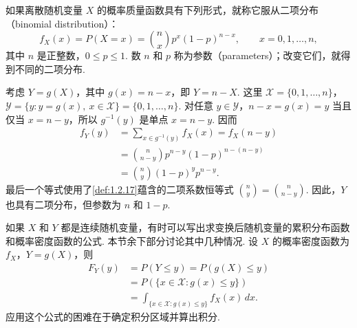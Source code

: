 \begin{example}[二项变换]\label{ex:2.1.1}
如果离散随机变量 $X$ 的概率质量函数具有下列形式，就称它服从二项分布（binomial distribution）：
\begin{equation}\label{eq:2.1.3}
f_X(x)=P(X=x)=\binom nx p^x(1-p)^{n-x},\qquad x=0,1,\ldots,n,
\end{equation}
其中 $n$ 是正整数，$0\le p\le1$. 数 $n$ 和 $p$ 称为参数（parameters）；改变它们，就得到不同的二项分布.

考虑 $Y=g(X)$，其中 $g(x)=n-x$，即 $Y=n-X$. 这里 $\mathscr X=\{0,1,\ldots,n\}$，$\mathscr Y=\{y:y=g(x),\ x\in\mathscr X\}=\{0,1,\ldots,n\}$. 对任意 $y\in\mathscr Y$，$n-x=g(x)=y$ 当且仅当 $x=n-y$，所以 $g^{-1}(y)$ 是单点 $x=n-y$. 因而
$$
\begin{aligned}
f_Y(y)&=\sum_{x\in g^{-1}(y)}f_X(x)=f_X(n-y)\\
&=\binom n{n-y}p^{n-y}(1-p)^{n-(n-y)}\\
&=\binom ny(1-p)^y p^{n-y}.
\end{aligned}
$$
最后一个等式使用了\autoref{def:1.2.17}蕴含的二项系数恒等式 $\binom ny=\binom n{n-y}$. 因此，$Y$ 也具有二项分布，但参数为 $n$ 和 $1-p$.
\end{example}

如果 $X$ 和 $Y$ 都是连续随机变量，有时可以写出求变换后随机变量的累积分布函数和概率密度函数的公式. 本节余下部分讨论其中几种情况. 设 $X$ 的概率密度函数为 $f_X$，$Y=g(X)$，则
\begin{equation}\label{eq:2.1.4}
\begin{aligned}
F_Y(y)&=P(Y\le y)=P(g(X)\le y)\\
&=P(\{x\in\mathscr X:g(x)\le y\})\\
&=\int_{\{x\in\mathscr X:g(x)\le y\}}f_X(x)\,dx.
\end{aligned}
\end{equation}
应用这个公式的困难在于确定积分区域并算出积分.

